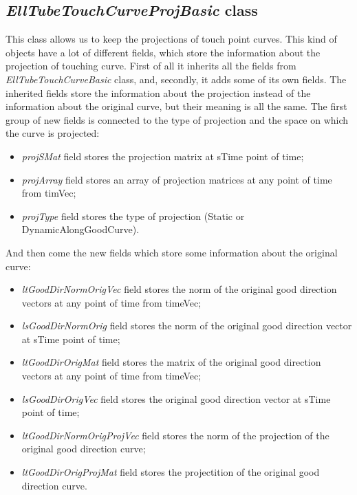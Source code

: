 \documentclass[letterpaper,10pt,english]{sphinxmanual}
\begin{document}
\subsection{\emph{EllTubeTouchCurveProjBasic} class}
\label{chap_ellTube:elltubetouchcurveprojbasic-class}
This class allows us to keep the projections of touch point curves. This kind of objects have a lot of different fields, which store the information about the projection of touching curve. First of all it inherits all the fields from \emph{EllTubeTouchCurveBasic} class, and, secondly, it adds some of its own fields. The inherited fields store the information about the projection instead of the information about the original curve, but their meaning is all the same.
The first group of new fields is connected to the type of projection and the space on which the curve is projected:
\begin{itemize}
\item {} 
\emph{projSMat} field stores the projection matrix at sTime point of time;

\item {} 
\emph{projArray} field stores an array of projection matrices at any point of time from timVec;

\item {} 
\emph{projType} field stores the type of projection (Static or DynamicAlongGoodCurve).

\end{itemize}

And then come the new fields which store some information about the original curve:
\begin{itemize}
\item {} 
\emph{ltGoodDirNormOrigVec} field stores the norm of the original good direction vectors at any        point of time from timeVec;

\item {} 
\emph{lsGoodDirNormOrig} field stores the norm of the original good direction vector at sTime        point of time;

\item {} 
\emph{ltGoodDirOrigMat} field stores the matrix of the original good direction vectors at any        point of time from timeVec;

\item {} 
\emph{lsGoodDirOrigVec} field stores the original good direction vector at sTime point of time;

\item {} 
\emph{ltGoodDirNormOrigProjVec} field stores the norm of the projection of the original good        direction curve;

\item {} 
\emph{ltGoodDirOrigProjMat} field stores the projectition of the original good direction curve.

\end{itemize}
\end{document}
